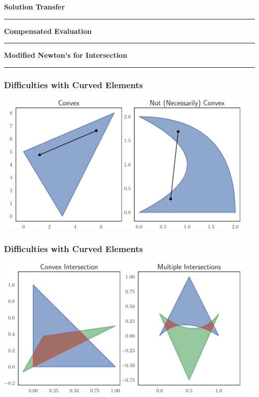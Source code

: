 \documentclass{beamer}
\begin{document}

\begin{frame}
\centering
{\Large \bf Solution Transfer}
\rule{0.82\textwidth}{1pt}
\end{frame}


\begin{frame}
\centering
{\Large \bf Compensated Evaluation}
\rule{0.82\textwidth}{1pt}
\end{frame}


\begin{frame}
\centering
{\Large \bf Modified Newton's for Intersection}
\rule{0.82\textwidth}{1pt}
\end{frame}

\begin{frame}
\frametitle{Difficulties with Curved Elements}
\begin{center}
\includegraphics[width=0.95\textwidth]
                {../images/slides/not_convex.pdf}
\end{center}
\end{frame}

\begin{frame}
\frametitle{Difficulties with Curved Elements}
\begin{center}
\includegraphics[width=0.95\textwidth]
                {../images/slides/split_intersection.pdf}
\end{center}
\end{frame}
\end{document}
